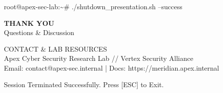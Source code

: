 \documentclass[aspectratio=169, 10pt]{beamer}
\begin{document}
\begin{frame}[plain]
  \vfill
  \begin{terminalbox}{root@apex-sec-lab:\textasciitilde\# ./shutdown\_presentation.sh --success}
    \vspace{8pt}
    \begin{center}
      {\ttfamily\Huge\bfseries\color{cybercyan} THANK YOU} \\[6pt]
      {\color{textlight}\Large Questions \& Discussion} \\[12pt]
      
      \begin{tcolorbox}[colback=bgcard, colframe=borderdark, arc=3pt, width=0.85\textwidth, halign=center, top=4pt, bottom=4pt]
        {\ttfamily\color{cybergreen}\small CONTACT \& LAB RESOURCES} \\[2pt]
        {\small\color{textlight} Apex Cyber Security Research Lab // Vertex Security Alliance} \\[1pt]
        {\ttfamily\color{cybercyan}\small Email: contact@apex-sec.internal \hspace{8pt}|\hspace{8pt} Docs: https://meridian.apex.internal}
      \end{tcolorbox}
      \vspace{8pt}
      
      {\ttfamily\color{textmuted}\small Session Terminated Successfully. Press [ESC] to Exit.}
    \end{center}
    \vspace{4pt}
  \end{terminalbox}
  \vfill
\end{frame}
\end{document}

